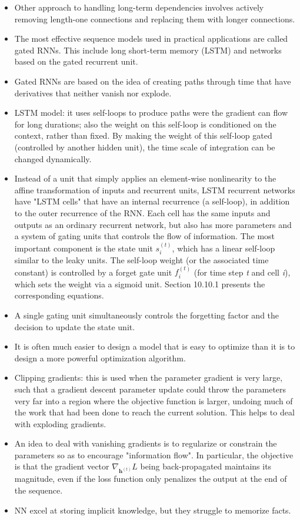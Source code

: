 \documentclass{article}
\begin{document}
\begin{itemize}
\item Other approach to handling long-term dependencies involves actively removing length-one connections and replacing them with longer connections.
\item The most effective sequence models used in practical applications are called gated RNNs. This include long short-term memory (LSTM) and networks based on the gated recurrent unit.
\item Gated RNNs are based on the idea of creating paths through time that have derivatives that neither vanish nor explode.
\item LSTM model: it uses self-loops to produce paths were the gradient can flow for long durations; also the weight on this self-loop is conditioned on the context, rather than fixed. By making the weight of this self-loop gated (controlled by another hidden unit), the time scale of integration can be changed dynamically.
\item Instead of a unit that simply applies an element-wise nonlinearity to the affine transformation of inputs and recurrent units, LSTM recurrent networks have "LSTM cells" that have an internal recurrence (a self-loop), in addition to the outer recurrence of the RNN. Each cell has the same inputs and outputs as an ordinary recurrent network, but also has more parameters and a system of gating units that controls the flow of information. The most important component is the state unit \(s^{(t)}_i\), which has a linear self-loop similar to the leaky units. The self-loop weight (or the associated time constant) is controlled by a forget gate unit \(f^{(t)}_i\) (for time step \textit{t} and cell \textit{i}), which sets the weight via a sigmoid unit. Section 10.10.1 presents the corresponding equations.
\item A single gating unit simultaneously controls the forgetting factor and the decision to update the state unit.
\item It is often much easier to design a model that is easy to optimize than it is to design a more powerful optimization algorithm.
\item Clipping gradients: this is used when the parameter gradient is very large, such that a gradient descent parameter update could throw the parameters very far into a region where the objective function is larger, undoing much of the work that had been done to reach the current solution. This helps to deal with exploding gradients.
\item An idea to deal with vanishing gradients is to regularize or constrain the parameters  so as to encourage "information flow". In particular, the objective is that the gradient vector \(\nabla_{\boldsymbol{h}^{(t)}}L\) being back-propagated maintains its magnitude, even if the loss function only penalizes the output at the end of the sequence.
\item NN excel at storing implicit knowledge, but they struggle to memorize facts.
\end{itemize}
\end{document}
